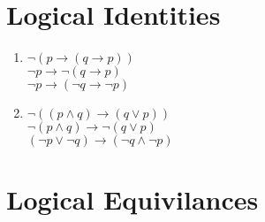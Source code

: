 \documentclass[11pt]{article}
\begin{document}
\section{Logical Identities} 

\begin{enumerate}
\item 
$\neg(p \rightarrow (q \rightarrow p))$\\
$\neg p \rightarrow  \neg(q \rightarrow p)$\\
$\neg p \rightarrow (\neg q \rightarrow \neg p)$\\

\item
$\neg((p \land q) \rightarrow (q \lor p))$\\
$\neg(p \land q) \rightarrow \neg(q \lor p)$\\
$(\neg p \lor \neg q) \rightarrow (\neg q \land \neg p)$\\
\end{enumerate}

\section{Logical Equivilances}
\end{document}

